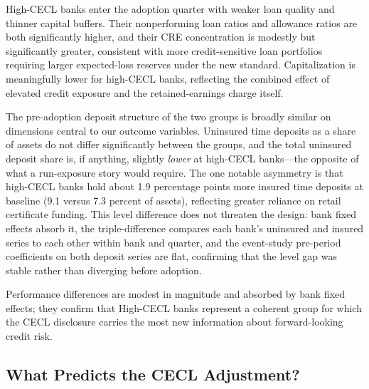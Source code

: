 High-CECL banks enter the adoption quarter with weaker loan quality and thinner
capital buffers.  Their nonperforming loan ratios and allowance ratios are both
significantly higher, and their CRE concentration is modestly but significantly
greater, consistent with more credit-sensitive loan portfolios requiring larger
expected-loss reserves under the new standard.  Capitalization is meaningfully
lower for high-CECL banks, reflecting the combined effect of elevated credit
exposure and the retained-earnings charge itself.

The pre-adoption deposit structure of the two groups is broadly similar on
dimensions central to our outcome variables.  Uninsured time deposits as a
share of assets do not differ significantly between the groups, and the total
uninsured deposit share is, if anything, slightly \emph{lower} at high-CECL
banks---the opposite of what a run-exposure story would require.  The one
notable asymmetry is that high-CECL banks hold about 1.9 percentage points
more insured time deposits at baseline (9.1 versus 7.3 percent of assets),
reflecting greater reliance on retail certificate funding.  This level
difference does not threaten the design: bank fixed effects absorb it, the
triple-difference compares each bank's uninsured and insured series to each
other within bank and quarter, and the event-study pre-period coefficients on
both deposit series are flat, confirming that the level gap was stable rather
than diverging before adoption.

Performance differences are modest in magnitude and absorbed by bank fixed
effects; they confirm that High-CECL banks represent a coherent group for which
the CECL disclosure carries the most new information about forward-looking credit
risk.

\subsection{What Predicts the CECL Adjustment?}
\label{sec:descriptive:predictors}

